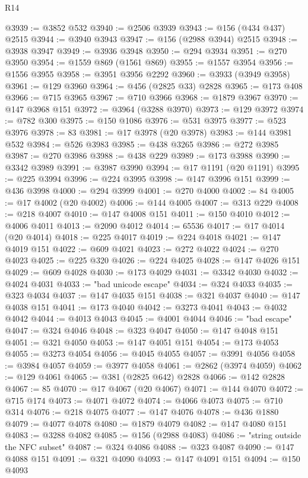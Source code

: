 \begin{lexlean}{R14}
\begin{coremodule}
@3939 := @3852 @532
@3940 := @2506 @3939
@3943 := @156 (@434 @437) @2515
@3944 := @3940 @3943
@3947 := @156 (@2988 @3944) @2515
@3948 := @3938 @3947
@3949 := @3936 @3948
@3950 := @294 @3934
@3951 := @270 @3950
@3954 := @1559 @869 (@1561 @869)
@3955 := @1557 @3954
@3956 := @1556 @3955
@3958 := @3951 @3956 @2292
@3960 := @3933 (@3949 @3958)
@3961 := @129 @3960
@3964 := @456 (@2825 @33) @2828
@3965 := @173 @408
@3966 := @715 @3965
@3967 := @710 @3966
@3968 := @1879 @3967
@3970 := @147 @3968 @151
@3972 := @3964 (@3288 @3970)
@3973 := @129 @3972
@3974 := @782 @300
@3975 := @150 @1086
@3976 := @531 @3975
@3977 := @523 @3976
@3978 := 83
@3981 := @17 @3978 (@20 @3978)
@3983 := @144 @3981 @532
@3984 := @526 @3983
@3985 := @438 @3265
@3986 := @272 @3985
@3987 := @270 @3986
@3988 := @438 @229
@3989 := @173 @3988
@3990 := @3342 @3989
@3991 := @3987 @3990
@3994 := @17 @1191 (@20 @1191)
@3995 := @225 @3994
@3996 := @224 @3995
@3998 := @147 @3996 @151
@3999 := @436 @3998
@4000 := @294 @3999
@4001 := @270 @4000
@4002 := 84
@4005 := @17 @4002 (@20 @4002)
@4006 := @144 @4005
@4007 := @313 @229
@4008 := @218 @4007
@4010 := @147 @4008 @151
@4011 := @150 @4010
@4012 := @4006 @4011
@4013 := @2090 @4012
@4014 := 65536
@4017 := @17 @4014 (@20 @4014)
@4018 := @225 @4017
@4019 := @224 @4018
@4021 := @147 @4019 @151
@4022 := @609 @4021
@4023 := @272 @4022
@4024 := @270 @4023
@4025 := @225 @320
@4026 := @224 @4025
@4028 := @147 @4026 @151
@4029 := @609 @4028
@4030 := @173 @4029
@4031 := @3342 @4030
@4032 := @4024 @4031
@4033 := "bad unicode escape"
@4034 := @324 @4033
@4035 := @323 @4034
@4037 := @147 @4035 @151
@4038 := @321 @4037
@4040 := @147 @4038 @151
@4041 := @173 @4040
@4042 := @3273 @4041
@4043 := @4032 @4042
@4044 := @4013 @4043
@4045 := @4001 @4044
@4046 := "bad escape"
@4047 := @324 @4046
@4048 := @323 @4047
@4050 := @147 @4048 @151
@4051 := @321 @4050
@4053 := @147 @4051 @151
@4054 := @173 @4053
@4055 := @3273 @4054
@4056 := @4045 @4055
@4057 := @3991 @4056
@4058 := @3984 @4057
@4059 := @3977 @4058
@4061 := @2862 (@3974 @4059)
@4062 := @129 @4061
@4065 := @381 (@2825 @642) @2828
@4066 := @142 @2828
@4067 := 85
@4070 := @17 @4067 (@20 @4067)
@4071 := @144 @4070
@4072 := @715 @174
@4073 := @4071 @4072
@4074 := @4066 @4073
@4075 := @710 @314
@4076 := @218 @4075
@4077 := @147 @4076
@4078 := @436 @1880
@4079 := @4077 @4078
@4080 := @1879 @4079
@4082 := @147 @4080 @151
@4083 := @3288 @4082
@4085 := @156 (@2988 @4083)
@4086 := "string outside the NFC subset"
@4087 := @324 @4086
@4088 := @323 @4087
@4090 := @147 @4088 @151
@4091 := @321 @4090
@4093 := @147 @4091 @151
@4094 := @150 @4093

\end{coremodule}
\end{lexlean}
